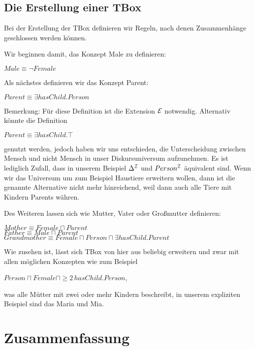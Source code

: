 \documentclass[runningheads,a4paper]{llncs}
\begin{document}
\subsection{Die Erstellung einer TBox}

Bei der Erstellung der TBox definieren wir Regeln, nach denen Zusammenhänge geschlossen werden können.

Wir beginnen damit, das Konzept Male  zu definieren:
	\begin{center}
	$Male\equiv \neg Female$
	\end{center}
Als nächstes definieren wir das Konzept Parent:
	\begin{center}
	$Parent\equiv \exists hasChild.Person $
	\end{center}
Bemerkung: Für diese Definition ist die Extension $\cal E$ notwendig. Alternativ könnte die Definition 
	\begin{center}
	$Parent\equiv \exists hasChild.\top $
	\end{center}
genutzt werden, jedoch haben wir uns entschieden, die Unterscheidung zwischen Mensch und nicht Mensch in unser Diskursuniversum aufzunehmen. Es ist lediglich Zufall, dass in unserem Beispiel $\Delta^{\cal I}$ und $Person^{\cal I}$ äquivalent sind. Wenn wir das Universum um zum Beispiel Haustiere erweitern wollen, dann ist die genannte Alternative nicht mehr hinreichend, weil dann auch alle Tiere mit Kindern Parents währen.

Des Weiteren lassen sich wie Mutter,  Vater oder Großmutter definieren:
	\begin{center}
	$Mother\equiv Female\sqcap Parent $\\
	$Father\equiv Male\sqcap Parent $\\
 	$Grandmother \equiv Female \sqcap Person \sqcap  \exists hasChild.Parent$ 
	\end{center}

Wie zusehen ist, lässt sich TBox von hier aus beliebig erweitern und zwar mit allen möglichen Konzepten wie zum Beispiel
	\begin{center}
 	$Person\sqcap Female \sqcap  \geqslant 2 \,hasChild.Person $,
	\end{center}
 was alle Mütter mit zwei oder mehr Kindern beschreibt, in unserem expliziten Beispiel sind das Maria und Mia.



\section{Zusammenfassung}
\end{document}
